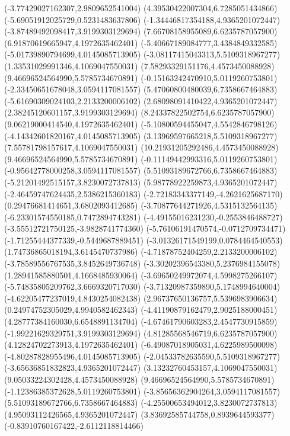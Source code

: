 {(-3.77429027162307,2.9809652541004)
(4.39530422007304,6.7285051434866)
(-5.69051912025729,0.5231483637806)
(-1.34446817354188,4.9365201072447)
(-3.87489492098417,3.9199303129694)
(7.66708158955089,6.6235787057900)
(6.91870619665947,4.1972635462401)
(-5.40667189084777,3.4384849332585)
(-5.01739890794699,4.0145085713905)
(-3.08117415043313,5.5109318967277)
(1.33531029991346,4.1069047550031)
(7.58293329151176,4.4573450088928)
(9.46696524564990,5.5785734670891)
(-0.15163242470910,5.0119260753801)
(-2.33450651678048,3.0594117081557)
(5.47060800480039,6.7358667464883)
(-5.61690309024103,2.2133200006102)
(2.68098091410422,4.9365201072447)
(2.38245120601157,3.9199303129694)
(8.24337822502754,6.6235787057900)
(9.06219000414540,4.1972635462401)
(-5.10800594455047,4.5542846798126)
(-4.14342601820167,4.0145085713905)
(3.13969597665218,5.5109318967277)
(7.55781798157617,4.1069047550031)
(10.21931205292486,4.4573450088928)
(9.46696524564990,5.5785734670891)
(-0.11149442993316,5.0119260753801)
(-0.95642778000258,3.0594117081557)
(5.51093189672766,6.7358667464883)
(-5.21201492515157,3.8230072737813)
(5.98778922259873,4.9365201072447)
(-2.46459747624435,2.5386215360183)
(-2.72183343377149,-4.2621625687170)
(0.29476681414651,3.6802093412685)
(-3.70877644271926,4.5315132564135)
(-6.23301574550185,0.7472894743281)
(-4.49155016231230,-0.2553846488727)
(-3.55512721750125,-3.9828741774360)
(-5.76106191470574,-0.0712709734471)
(-1.71255444377339,-0.5449687889451)
(-3.01326171549199,0.0784464540553)
(1.74736865018194,3.6145470737986)
(-4.71878752404259,2.2133200006102)
(-3.78589556767535,3.8452649736748)
(-3.30202396543380,5.2376984155078)
(1.28941585880501,4.1668485930064)
(-3.69650249972074,4.5998275266107)
(-5.74835805209762,3.6669320717030)
(-3.71320987359890,5.1748994640004)
(-4.62205477237019,4.8430254082438)
(2.96737650136757,5.5396983906634)
(0.24974752305029,4.9940582462343)
(-4.41190879162479,2.9025188000451)
(4.28777384160030,6.6548891134704)
(-4.67461790603283,2.4547730915859)
(-1.99221629329751,3.9199303129694)
(4.81285568546719,6.6235787057900)
(4.12824702273913,4.1972635462401)
(-6.49087018905031,4.6225989500098)
(-4.80287828955496,4.0145085713905)
(-2.04533782635590,5.5109318967277)
(-3.65636851832823,4.9365201072447)
(3.13232760453157,4.1069047550031)
(9.05033224302428,4.4573450088928)
(9.46696524564990,5.5785734670891)
(-1.12386385372628,5.0119260753801)
(-3.85656362904264,3.0594117081557)
(5.51093189672766,6.7358667464883)
(-4.25500653494012,3.8230072737813)
(4.95093112426565,4.9365201072447)
(3.83692585744758,0.8939644593377)
(-0.83910760167422,-2.6112118814466)
}
